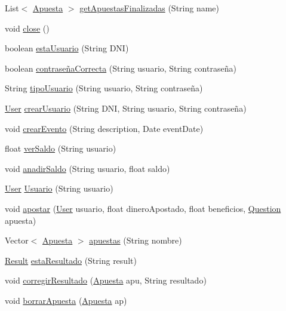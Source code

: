 \begin{DoxyCompactItemize}
\item 
List$<$ \mbox{\hyperlink{classdomain_1_1Apuesta}{Apuesta}} $>$ \mbox{\hyperlink{classdataAccess_1_1DataAccess_a19005b9483a66900f576a028daca8521}{get\+Apuestas\+Finalizadas}} (String name)
\item 
void \mbox{\hyperlink{classdataAccess_1_1DataAccess_a58d3d443d0a2f5d74b6240248a257fd5}{close}} ()
\item 
boolean \mbox{\hyperlink{classdataAccess_1_1DataAccess_a68ae3ab95c34b9d717958d3cf30e422d}{esta\+Usuario}} (String D\+NI)
\item 
boolean \mbox{\hyperlink{classdataAccess_1_1DataAccess_a58efde6fe991961b74b803db2b25e00d}{contraseña\+Correcta}} (String usuario, String contraseña)
\item 
String \mbox{\hyperlink{classdataAccess_1_1DataAccess_acc6cd522fd82ae521a9cb25ff7ad8c88}{tipo\+Usuario}} (String usuario, String contraseña)
\item 
\mbox{\hyperlink{classdomain_1_1User}{User}} \mbox{\hyperlink{classdataAccess_1_1DataAccess_a0d07e5c7500fe26432a534933c73797e}{crear\+Usuario}} (String D\+NI, String usuario, String contraseña)
\item 
void \mbox{\hyperlink{classdataAccess_1_1DataAccess_a774dba248bc45a075a25fafc353a1ff6}{crear\+Evento}} (String description, Date event\+Date)
\item 
float \mbox{\hyperlink{classdataAccess_1_1DataAccess_ab048adbfefe02c1275e098ecdb331a9e}{ver\+Saldo}} (String usuario)
\item 
void \mbox{\hyperlink{classdataAccess_1_1DataAccess_ab2e354d34f5c25f3ff732f03aa62c41a}{anadir\+Saldo}} (String usuario, float saldo)
\item 
\mbox{\hyperlink{classdomain_1_1User}{User}} \mbox{\hyperlink{classdataAccess_1_1DataAccess_a081df9fe42a2191febb4ff4f28a15f96}{Usuario}} (String usuario)
\item 
void \mbox{\hyperlink{classdataAccess_1_1DataAccess_a98e6a8f3599ce08aded1c405e39ced42}{apostar}} (\mbox{\hyperlink{classdomain_1_1User}{User}} usuario, float dinero\+Apostado, float beneficios, \mbox{\hyperlink{classdomain_1_1Question}{Question}} apuesta)
\item 
Vector$<$ \mbox{\hyperlink{classdomain_1_1Apuesta}{Apuesta}} $>$ \mbox{\hyperlink{classdataAccess_1_1DataAccess_af85ee7cd7c9918cef110050e529bc859}{apuestas}} (String nombre)
\item 
\mbox{\hyperlink{classdomain_1_1Result}{Result}} \mbox{\hyperlink{classdataAccess_1_1DataAccess_a7a9bb352594830bebe5abbf44e0b0da2}{esta\+Resultado}} (String result)
\item 
void \mbox{\hyperlink{classdataAccess_1_1DataAccess_aad18b312ff46e9d659bafddacef7c148}{corregir\+Resultado}} (\mbox{\hyperlink{classdomain_1_1Apuesta}{Apuesta}} apu, String resultado)
\item 
void \mbox{\hyperlink{classdataAccess_1_1DataAccess_a90059682282965ca5dcb832525b949bf}{borrar\+Apuesta}} (\mbox{\hyperlink{classdomain_1_1Apuesta}{Apuesta}} ap)
\end{DoxyCompactItemize}
